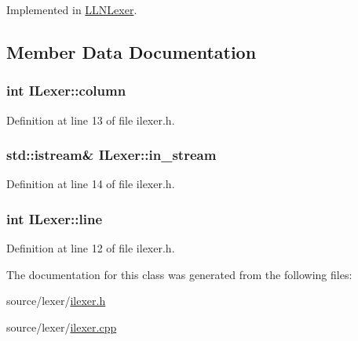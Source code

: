 Implemented in \hyperlink{class_l_l_n_lexer_a3832522afb32a85b3171f552ff9dd676}{LLNLexer}.



\subsection{Member Data Documentation}
\hypertarget{class_i_lexer_a05ce2bfa3595f992618d2a328b66bdfb}{
\subsubsection[{column}]{\setlength{\rightskip}{0pt plus 5cm}int {\bf ILexer::column}}}
\label{class_i_lexer_a05ce2bfa3595f992618d2a328b66bdfb}


Definition at line 13 of file ilexer.h.

\hypertarget{class_i_lexer_a02d418cc6fdcbfbf6cad7bf914cce77f}{
\subsubsection[{in\_\-stream}]{\setlength{\rightskip}{0pt plus 5cm}std::istream\& {\bf ILexer::in\_\-stream}}}
\label{class_i_lexer_a02d418cc6fdcbfbf6cad7bf914cce77f}


Definition at line 14 of file ilexer.h.

\hypertarget{class_i_lexer_a5d766f4f4dcc976553ab17a5753ef8ff}{
\subsubsection[{line}]{\setlength{\rightskip}{0pt plus 5cm}int {\bf ILexer::line}}}
\label{class_i_lexer_a5d766f4f4dcc976553ab17a5753ef8ff}


Definition at line 12 of file ilexer.h.



The documentation for this class was generated from the following files:\begin{DoxyCompactItemize}
\item 
source/lexer/\hyperlink{ilexer_8h}{ilexer.h}\item 
source/lexer/\hyperlink{ilexer_8cpp}{ilexer.cpp}\end{DoxyCompactItemize}
